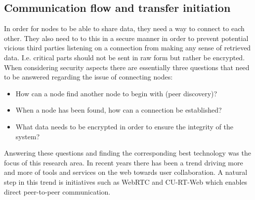 \subsection{Communication flow and transfer initiation}

In order for nodes to be able to share data, they need a way to connect to each other. They also need to to this in a secure manner in order to prevent potential vicious third parties listening on a connection from making any sense of retrieved data. I.e. critical parts should not be sent in raw form but rather be encrypted. When considering security aspects there are essentially three questions that need to be answered regarding the issue of connecting nodes:

\begin{itemize}
\item How can a node find another node to begin with (peer discovery)?
\item When a node has been found, how can a connection be established?
\item What data needs to be encrypted in order to ensure the integrity of the system?
\end{itemize}

Answering these questions and finding the corresponding best technology was the focus of this research area. In recent years there has been a trend driving more and more of tools and services on the web towards user collaboration. A natural step in this trend is initiatives such as WebRTC and CU-RT-Web which enables direct peer-to-peer communication.
